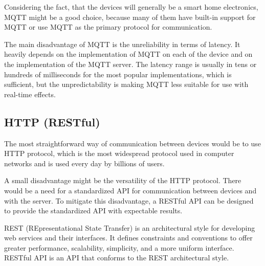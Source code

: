 Considering the fact, that the devices will generally be a smart home
electronics, MQTT might be a good choice, because many of them have built-in
support for MQTT or use MQTT as the primary protocol for communication.


The main disadvantage of MQTT is the unreliability in terms of latency.
It heavily depends on the implementation of MQTT on each of the device and on
the implementation of the MQTT server. The latency range is usually
in tens or hundreds of milliseconds for the most popular implementations,
\hyperlink{mqttlat}{} which is sufficient, but the unpredictability is making MQTT
less suitable for use with real-time effects.


\hypertarget{x-http-(restful)}{\subsection{HTTP (RESTful)}}
The most straightforward way of communication between devices would be to use
HTTP protocol, which is the most widespread protocol used in computer networks
and is used every day by billions of users. \hyperlink{httpsrv}{}


A small disadvantage might be the versatility of the HTTP protocol. There would be
a need for a standardized API for communication between devices and with the
server. To mitigate this disadvantage, a RESTful API can be designed to provide
the standardized API with expectable results.


REST (REpresentational State Transfer) is an architectural style for developing
web services and their interfaces. It defines constraints and conventions to
offer greater performance, scalability, simplicity, and a more uniform interface.
\hyperlink{restdef}{} RESTful API is an API that conforms to the REST architectural style.
